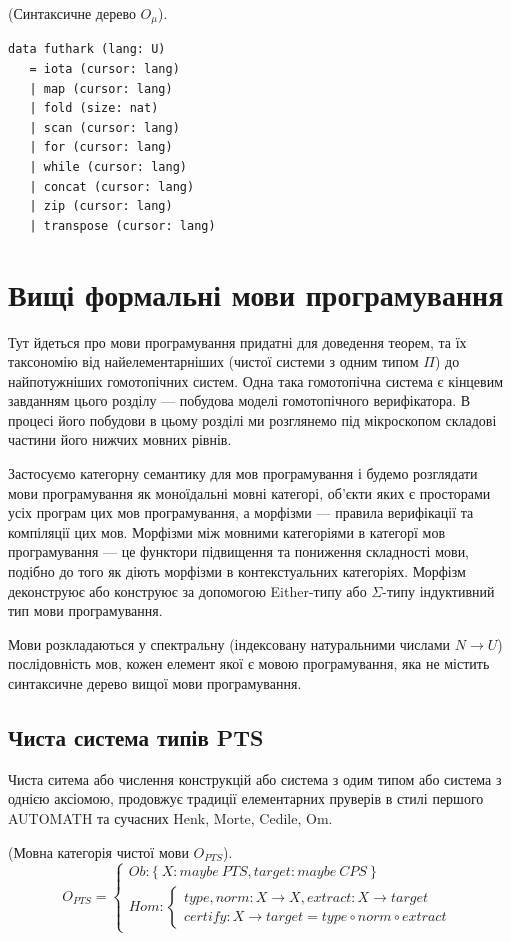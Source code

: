 \begin{definition} (Синтаксичне дерево $O_\mu$).
\begin{lstlisting}
data futhark (lang: U)
   = iota (cursor: lang)
   | map (cursor: lang)
   | fold (size: nat)
   | scan (cursor: lang)
   | for (cursor: lang)
   | while (cursor: lang)
   | concat (cursor: lang)
   | zip (cursor: lang)
   | transpose (cursor: lang)
\end{lstlisting}
\end{definition}

\newpage
\section{Вищі формальні мови програмування}
Тут йдеться про мови програмування придатні для доведення теорем,
та їх таксономію від найелементарніших (чистої системи з одним типом $\Pi$) до
найпотужніших гомотопічних систем. Одна така гомотопічна система є кінцевим завданням
цього розділу --- побудова моделі гомотопічного верифікатора.
В процесі його побудови в цьому розділі ми розглянемо під
мікроскопом складові частини його нижчих мовних рівнів.

Застосуємо категорну семантику для мов програмування і будемо розглядати
мови програмування як моноїдальні мовні категорі, об'єкти яких є просторами
усіх програм цих мов програмування, а морфізми --- правила верифікації та компіляції цих мов.
Морфізми між мовними категоріями в категорї мов програмування --- це
функтори підвищення та пониження складності мови, подібно до того як діють
морфізми в контекстуальних категоріях. Морфізм деконструює або конструює за
допомогою Either-типу або $\Sigma$-типу індуктивний тип мови програмування.

Мови розкладаються у спектральну (індексовану натуральними числами $N \rightarrow U$)
послідовність мов, кожен елемент якої є мовою програмування,
яка не містить синтаксичне дерево вищої мови програмування.

\newpage
\subsection{Чиста система типів PTS}
Чиста ситема або числення конструкцій або система з одим типом або
система з однією аксіомою, продовжує традиції елементарних пруверів
в стилі першого AUTOMATH та сучасних Henk, Morte, Cedile, Om.

\begin{definition} (Мовна категорія чистої мови $O_{PTS}$).
\begin{equation}
O_{PTS} =
\begin{cases}
Ob: \{\ X: maybe\ PTS, target: maybe\ CPS \ \} \\
Hom: \begin{cases}
type,norm: X \rightarrow X, extract: X \rightarrow target \\
certify: X \rightarrow target = type \circ norm \circ extract
\end{cases}
\end{cases}
\end{equation}
\end{definition}

